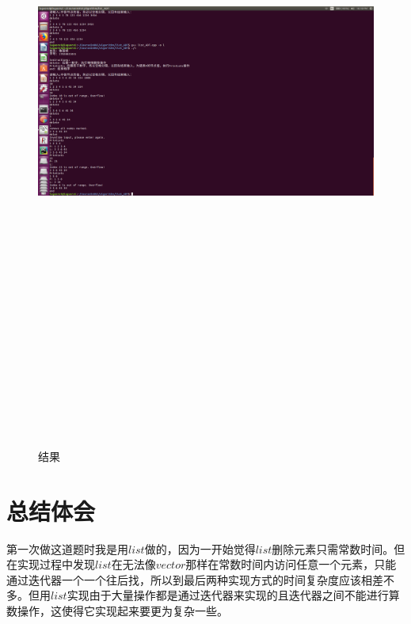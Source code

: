 \documentclass[UTF8]{ctexart}
\begin{document}
\begin{figure}[H]
	\centering 
	\includegraphics[width=18cm, height=23cm]{list_res.png} 
	\caption{结果} 
	\label{res}
\end{figure}
\newpage

	
	\section{总结体会}
	\indent 第一次做这道题时我是用$list$做的，因为一开始觉得$list$删除元素只需常数时间。但在实现过程中发现$list$在无法像$vector$那样在常数时间内访问任意一个元素，只能通过迭代器一个一个往后找，所以到最后两种实现方式的时间复杂度应该相差不多。但用$list$实现由于大量操作都是通过迭代器来实现的且迭代器之间不能进行算数操作，这使得它实现起来要更为复杂一些。


\end{document}
